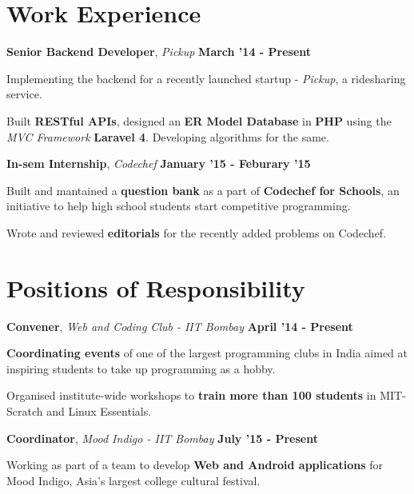 \documentclass[11pt]{resume}
\begin{document}
\begin{resume}
\section{\mysidestyle Work Experience}
\textbf{Senior Backend Developer}, \textsl{Pickup} \hfill \textbf{March '14 - Present}

\begin{list2}
\item Implementing the backend for a recently launched startup - \textit {Pickup}, a ridesharing service.
\item Built \textbf {RESTful APIs}, designed an \textbf {ER Model Database} in \textbf {PHP} using the \textit {MVC Framework} \textbf{Laravel 4}. Developing algorithms for the same.
\end{list2}

\textbf{In-sem Internship}, \textsl{Codechef} \hfill \textbf{January '15 - Feburary '15}\\
\vspace{-4mm}
\begin{list2}
\item Built and mantained a \textbf{question bank} as a part of \textbf {Codechef for Schools}, an initiative to help high school students start competitive programming.
\item Wrote and reviewed \textbf{editorials} for the recently added problems on Codechef.
\end{list2}

\section{\mysidestyle Positions of Responsibility}
\textbf{Convener}, \textit{Web and Coding Club - IIT Bombay} \hfill \textbf{April '14 - Present}\\

\vspace{-4mm}
\begin{list2}
\item \textbf{Coordinating events} of one of the largest programming clubs in India aimed at inspiring students to take up programming as a hobby.
\item Organised institute-wide workshops to \textbf{train more than 100 students} in MIT-Scratch and Linux Essentials.
\end{list2}

\textbf{Coordinator}, \textit{Mood Indigo - IIT Bombay} \hfill \textbf{July '15 - Present}\\
\vspace{-4mm}
\begin{list2}
\item Working as part of a team to develop \textbf{Web and Android applications} for Mood Indigo, Asia's largest college cultural festival. 
\end{list2}




\end{resume}
\end{document}
